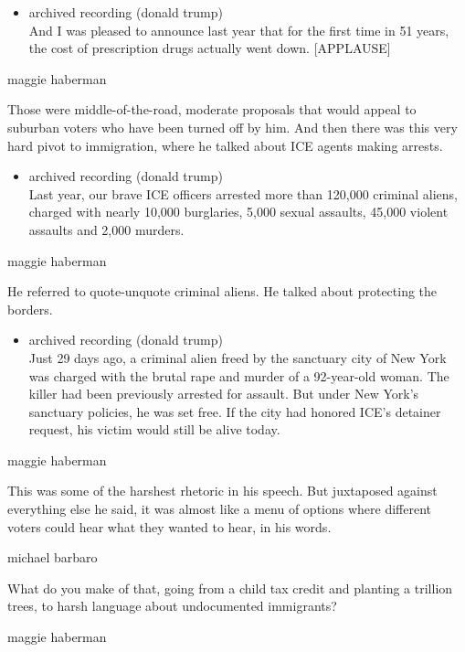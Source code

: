 \begin{itemize}
\tightlist
\item
  archived recording (donald trump)\\
  And I was pleased to announce last year that for the first time in 51
  years, the cost of prescription drugs actually went down.
  {[}APPLAUSE{]}
\end{itemize}

maggie haberman

Those were middle-of-the-road, moderate proposals that would appeal to
suburban voters who have been turned off by him. And then there was this
very hard pivot to immigration, where he talked about ICE agents making
arrests.

\begin{itemize}
\tightlist
\item
  archived recording (donald trump)\\
  Last year, our brave ICE officers arrested more than 120,000 criminal
  aliens, charged with nearly 10,000 burglaries, 5,000 sexual assaults,
  45,000 violent assaults and 2,000 murders.
\end{itemize}

maggie haberman

He referred to quote-unquote criminal aliens. He talked about protecting
the borders.

\begin{itemize}
\tightlist
\item
  archived recording (donald trump)\\
  Just 29 days ago, a criminal alien freed by the sanctuary city of New
  York was charged with the brutal rape and murder of a 92-year-old
  woman. The killer had been previously arrested for assault. But under
  New York's sanctuary policies, he was set free. If the city had
  honored ICE's detainer request, his victim would still be alive today.
\end{itemize}

maggie haberman

This was some of the harshest rhetoric in his speech. But juxtaposed
against everything else he said, it was almost like a menu of options
where different voters could hear what they wanted to hear, in his
words.

michael barbaro

What do you make of that, going from a child tax credit and planting a
trillion trees, to harsh language about undocumented immigrants?

maggie haberman

